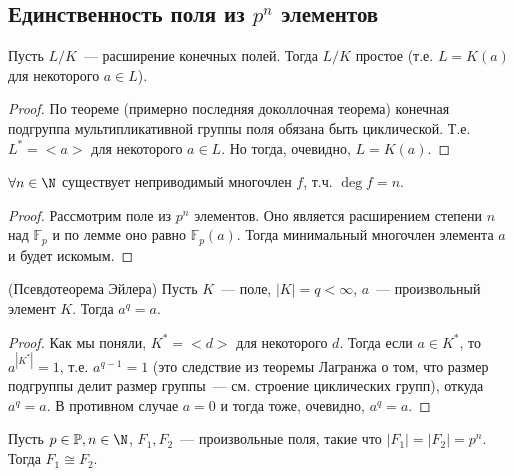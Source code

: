 \subsection{Единственность поля из $p^n$ элементов}
\begin{lemma}
    Пусть $L/K$~--- расширение конечных полей.
    Тогда $L/K$ простое (т.е. $L=K(a)$ для некоторого $a\in L$).
\end{lemma}
\begin{proof}
    По теореме (примерно последняя доколлочная теорема) конечная подгруппа мультипликативной группы поля обязана быть циклической.
    Т.е. $L^* = <a>$ для некоторого $a\in L$.
    Но тогда, очевидно, $L=K(a)$.
\end{proof}
\follow $\forall n\in \N$ существует неприводимый многочлен $f$, т.ч. $\deg f = n$.
\begin{proof}
    Рассмотрим поле из $p^n$ элементов.
    Оно является расширением степени $n$ над $\mathbb{F}_p$ и по лемме оно равно $\mathbb{F}_p(a)$.
    Тогда минимальный многочлен элемента $a$ и будет искомым.
\end{proof}
\begin{theorem}(Псевдотеорема Эйлера)
    Пусть $K$~--- поле, $|K|=q<\infty$, $a$~--- произвольный элемент $K$.
    Тогда $a^q=a$.
\end{theorem}
\begin{proof}
    Как мы поняли, $K^* = <d>$ для некоторого $d$.
    Тогда если $a\in K^*$, то $a^{|K^*|}=1$, т.е. $a^{q-1}=1$ (это следствие из теоремы Лагранжа о том, что размер подгруппы делит размер группы~--- см. строение циклических групп), откуда $a^q=a$.
    В противном случае $a=0$ и тогда тоже, очевидно, $a^q=a$.
\end{proof}
\begin{theorem}
    Пусть $p\in \mathbb{P}, n\in \N$, $F_1, F_2$~--- произвольные поля, такие что $|F_1|=|F_2|=p^n$.
    Тогда $F_1\cong F_2$.
\end{theorem}
